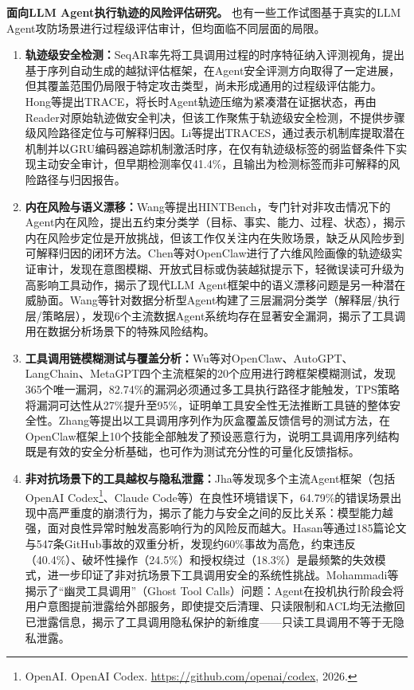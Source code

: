 \textbf{面向LLM Agent执行轨迹的风险评估研究。}
也有一些工作试图基于真实的LLM Agent攻防场景进行过程级评估审计，但均面临不同层面的局限。
\begin{enumerate}
  \item \textbf{轨迹级安全检测：}SeqAR\cite{yang2025seqar}率先将工具调用过程的时序特征纳入评测视角，提出基于序列自动生成的越狱评估框架，在Agent安全评测方向取得了一定进展，但其覆盖范围仍局限于特定攻击类型，尚未形成通用的过程级评估能力。Hong等\cite{hong2026trace}提出TRACE，将长时Agent轨迹压缩为紧凑潜在证据状态，再由Reader对原始轨迹做安全判决，但该工作聚焦于轨迹级安全检测，不提供步骤级风险路径定位与可解释归因。Li等\cite{li2026traces}提出TRACES，通过表示机制库提取潜在机制并以GRU编码器追踪机制激活时序，在仅有轨迹级标签的弱监督条件下实现主动安全审计，但早期检测率仅41.4\%，且输出为检测标签而非可解释的风险路径与归因报告。
  \item \textbf{内在风险与语义漂移：}Wang等\cite{wang2026hintbench}提出HINTBench，专门针对非攻击情况下的Agent内在风险，提出五约束分类学（目标、事实、能力、过程、状态），揭示内在风险步定位是开放挑战，但该工作仅关注内在失败场景，缺乏从风险步到可解释归因的闭环方法。Chen等\cite{chen2026trajectorybased}对OpenClaw进行了六维风险画像的轨迹级实证审计，发现在意图模糊、开放式目标或伪装越狱提示下，轻微误读可升级为高影响工具动作，揭示了现代LLM Agent框架中的语义漂移问题是另一种潜在威胁面。Wang等\cite{wang2026data}针对数据分析型Agent构建了三层漏洞分类学（解释层/执行层/策略层），发现6个主流数据Agent系统均存在显著安全漏洞，揭示了工具调用在数据分析场景下的特殊风险结构。
  \item \textbf{工具调用链模糊测试与覆盖分析：}Wu等\cite{wu2026chainfuzzer}对OpenClaw、AutoGPT、LangChain、MetaGPT四个主流框架的20个应用进行跨框架模糊测试，发现365个唯一漏洞，82.74\%的漏洞必须通过多工具执行路径才能触发，TPS策略将漏洞可达性从27\%提升至95\%，证明单工具安全性无法推断工具链的整体安全性。Zhang等\cite{zhang2026verigrey}提出以工具调用序列作为灰盒覆盖反馈信号的测试方法，在OpenClaw框架上10个技能全部触发了预设恶意行为，说明工具调用序列结构既是有效的安全分析基础，也可作为测试充分性的可量化反馈指标。
  \item \textbf{非对抗场景下的工具越权与隐私泄露：}Jha等\cite{jha2026agent}发现多个主流Agent框架（包括OpenAI Codex\footnote{OpenAI. OpenAI Codex. \url{https://github.com/openai/codex}, 2026.}、Claude Code等）在良性环境错误下，64.79\%的错误场景出现中高严重度的崩溃行为，揭示了能力与安全之间的反比关系：模型能力越强，面对良性异常时触发高影响行为的风险反而越大。Hasan等\cite{hasan2026what}通过185篇论文与547条GitHub事故的双重分析，发现约60\%事故为高危，约束违反（40.4\%）、破坏性操作（24.5\%）和授权绕过（18.3\%）是最频繁的失效模式，进一步印证了非对抗场景下工具调用安全的系统性挑战。Mohammadi等\cite{mohammadi2026ghosttoolcalls}揭示了“幽灵工具调用”（Ghost Tool Calls）问题：Agent在投机执行阶段会将用户意图提前泄露给外部服务，即使提交后清理、只读限制和ACL均无法撤回已泄露信息，揭示了工具调用隐私保护的新维度——只读工具调用不等于无隐私泄露。

\end{enumerate}
